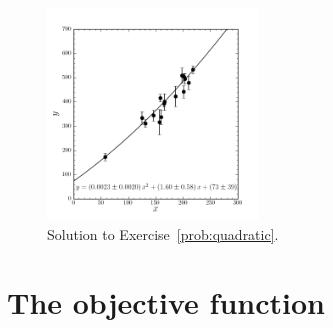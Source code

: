 \documentclass[12pt,twoside]{article}
\newcommand{\problemname}{Exercise}
\newcounter{problem}
\begin{document}
\begin{figure}[htbp]
\includegraphics[width=0.5\textwidth]{ex3.png}
\caption{Solution to \problemname~\ref{prob:quadratic}.}\label{fig:quadratic}
\end{figure}

\section{The objective function}\label{sec:objective}
\end{document}
